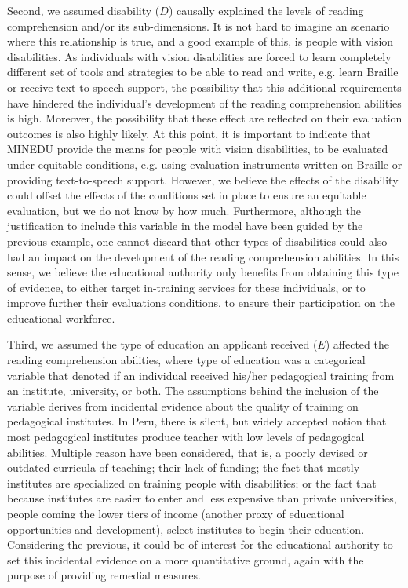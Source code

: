 Second, we assumed disability ($D$) causally explained the levels of reading comprehension and/or its sub-dimensions. It is not hard to imagine an scenario where this relationship is true, and a good example of this, is people with vision disabilities. As individuals with vision disabilities are forced to learn completely different set of tools and strategies to be able to read and write, e.g. learn Braille or receive text-to-speech support, the possibility that this additional requirements have hindered the individual's development of the reading comprehension abilities is high. Moreover, the possibility that these effect are reflected on their evaluation outcomes is also highly likely. At this point, it is important to indicate that MINEDU provide the means for people with vision disabilities, to be evaluated under equitable conditions, e.g. using evaluation instruments written on Braille or providing text-to-speech support. However, we believe the effects of the disability could offset the effects of the conditions set in place to ensure an equitable evaluation, but we do not know by how much. Furthermore, although the justification to include this variable in the model have been guided by the previous example, one cannot discard that other types of disabilities could also had an impact on the development of the reading comprehension abilities. In this sense, we believe the educational authority only benefits from obtaining this type of evidence, to either target in-training services for these individuals, or to improve further their evaluations conditions, to ensure their participation on the educational workforce. 

Third, we assumed the type of education an applicant received ($E$) affected the reading comprehension abilities, where type of education was a categorical variable that denoted if an individual received his/her pedagogical training from an institute, university, or both. The assumptions behind the inclusion of the variable derives from incidental evidence about the quality of training on pedagogical institutes. In Peru, there is silent, but widely accepted notion that most pedagogical institutes produce teacher with low levels of pedagogical abilities. Multiple reason have been considered, that is, a poorly devised or outdated curricula of teaching; their lack of funding; the fact that mostly institutes are specialized on training people with disabilities; or the fact that because institutes are easier to enter and less expensive than private universities, people coming the lower tiers of income (another proxy of educational opportunities and development), select institutes to begin their education. Considering the previous, it could be of interest for the educational authority to set this incidental evidence on a more quantitative ground, again with the purpose of providing remedial measures. 

